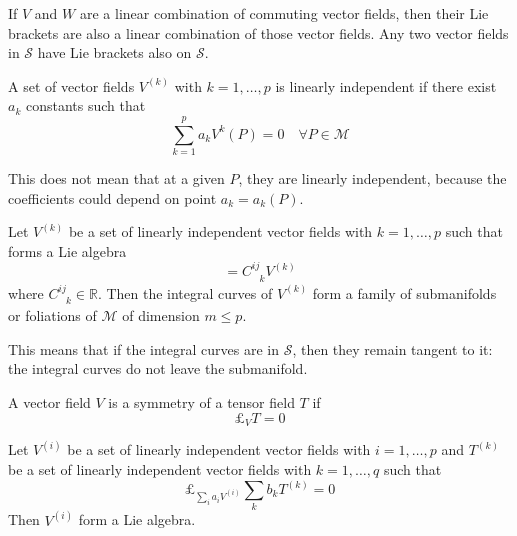     If $V$ and $W$ are a linear combination of commuting vector fields, then their Lie brackets are also a linear combination of those vector fields. Any two vector fields in $\mathcal S$ have Lie brackets also on $\mathcal S$. 

    \begin{definition}
        A set of vector fields $V^{(k)}$ with $k = 1, \ldots, p$ is linearly independent if there exist $a_k$ constants such that
        \begin{equation*}
            \sum_{k=1}^{p} a_k V^k (P) = 0 \quad \forall P \in \mathcal M 
        \end{equation*}
    \end{definition}
    \noindent This does not mean that at a given $P$, they are linearly independent, because the coefficients could depend on point $a_k = a_k (P)$.

    \begin{theorem}[Frobenius]
        Let $V^{(k)}$ be a set of linearly independent vector fields with $k = 1, \ldots, p$ such that forms a Lie algebra
        \begin{equation*}
            [V^{(i)},V^{(j)}] = C^{ij}_{\phantom{ij} k} V^{(k)}
        \end{equation*}
        where $C^{ij}_{\phantom{ij} k} \in \mathbb R$. Then the integral curves of $V^{(k)}$ form a family of submanifolds or foliations of $\mathcal M$ of dimension $m \leq p$.
    \end{theorem}
    This means that if the integral curves are in $\mathcal S$, then they remain tangent to it: the integral curves do not leave the submanifold.

    A vector field $V$ is a symmetry of a tensor field $T$ if 
    \begin{equation*}
        \pounds_V T = 0
    \end{equation*}

    \begin{theorem}
        Let $V^{(i)}$ be a set of linearly independent vector fields with $i = 1, \ldots, p$ and $T^{(k)}$ be a set of linearly independent vector fields with $k = 1, \ldots, q$ such that 
        \begin{equation*}
            \pounds_{\sum_i a_i V^{(i)}} \sum_k b_k T^{(k)} = 0
        \end{equation*}
        Then $V^{(i)}$ form a Lie algebra.
    \end{theorem}

